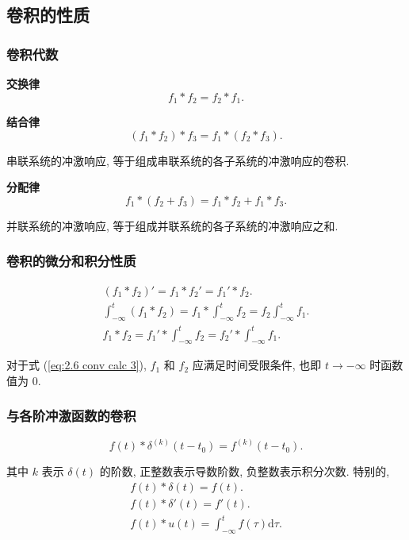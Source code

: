 \subsection{卷积的性质} \label{2 卷积的性质}

\subsubsection{卷积代数}

\textbf{交换律}
\begin{equation}
    f_1*f_2=f_2*f_1.
\end{equation}

\textbf{结合律}
\begin{equation}
    (f_1*f_2)*f_3=f_1*(f_2*f_3).
\end{equation}

串联系统的冲激响应, 等于组成串联系统的各子系统的冲激响应的卷积.

\textbf{分配律}
\begin{equation}
    f_1*(f_2+f_3)=f_1*f_2+f_1*f_3.
\end{equation}

并联系统的冲激响应, 等于组成并联系统的各子系统的冲激响应之和.

\subsubsection{卷积的微分和积分性质}
\rmg
\begin{gather}
    (f_1*f_2)'=f_1*f_2'=f_1'*f_2. \\
    \int_{-\infty}^{t}(f_1*f_2)=f_1*\int_{-\infty}^{t}f_2=f_2\int_{-\infty}^{t}f_1. \\
    f_1*f_2=f_1'*\int_{-\infty}^{t}f_2=f_2'*\int_{-\infty}^{t}f_1. \label{eq:2.6 conv calc 3}
\end{gather}

对于式 (\ref{eq:2.6 conv calc 3}), $f_1$ 和 $f_2$ 应满足时间受限条件, 也即 $t\rightarrow-\infty$ 时函数值为 0.

\subsubsection{与各阶冲激函数的卷积}
\rmg
\begin{equation}
    f(t)*\delta^{(k)}(t-t_0)=f^{(k)}(t-t_0).
\end{equation}

其中 $k$ 表示 $\delta(t)$ 的阶数, 正整数表示导数阶数, 负整数表示积分次数. 特别的,
\begin{gather}
    f(t)*\delta(t)=f(t). \label{eq:2.6 f(t)*delta(t)} \\
    f(t)*\delta'(t)=f'(t). \\
    f(t)*u(t)=\int_{-\infty}^{t}f(\tau)\mathrm{d}\tau.
\end{gather}
